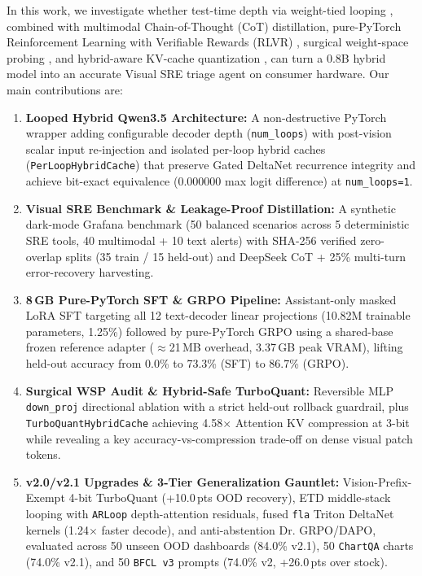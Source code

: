 \documentclass[10pt,letterpaper]{article}
\begin{document}
In this work, we investigate whether test-time depth via weight-tied looping \cite{looped}, combined with multimodal Chain-of-Thought (CoT) distillation, pure-PyTorch Reinforcement Learning with Verifiable Rewards (RLVR) \cite{deepseekr1}, surgical weight-space probing \cite{wsp}, and hybrid-aware KV-cache quantization \cite{turboquant}, can turn a 0.8B hybrid model into an accurate Visual SRE triage agent on consumer hardware. Our main contributions are:
\begin{enumerate}[leftmargin=1.5em,itemsep=2pt,topsep=3pt]
    \item \textbf{Looped Hybrid Qwen3.5 Architecture:} A non-destructive PyTorch wrapper adding configurable decoder depth (\texttt{num\_loops}) with post-vision scalar input re-injection and isolated per-loop hybrid caches (\texttt{PerLoopHybridCache}) that preserve Gated DeltaNet recurrence integrity and achieve bit-exact equivalence ($0.000000$ max logit difference) at \texttt{num\_loops=1}.
    \item \textbf{Visual SRE Benchmark \& Leakage-Proof Distillation:} A synthetic dark-mode Grafana benchmark (50 balanced scenarios across 5 deterministic SRE tools, 40 multimodal + 10 text alerts) with SHA-256 verified zero-overlap splits (35 train / 15 held-out) and DeepSeek CoT + 25\% multi-turn error-recovery harvesting.
    \item \textbf{8\,GB Pure-PyTorch SFT \& GRPO Pipeline:} Assistant-only masked LoRA SFT targeting all 12 text-decoder linear projections (10.82M trainable parameters, 1.25\%) followed by pure-PyTorch GRPO using a shared-base frozen reference adapter ($\approx$21\,MB overhead, 3.37\,GB peak VRAM), lifting held-out accuracy from 0.0\% to 73.3\% (SFT) to 86.7\% (GRPO).
    \item \textbf{Surgical WSP Audit \& Hybrid-Safe TurboQuant:} Reversible MLP \texttt{down\_proj} directional ablation with a strict held-out rollback guardrail, plus \texttt{TurboQuantHybridCache} achieving 4.58$\times$ Attention KV compression at 3-bit while revealing a key accuracy-vs-compression trade-off on dense visual patch tokens.
    \item \textbf{v2.0/v2.1 Upgrades \& 3-Tier Generalization Gauntlet:} Vision-Prefix-Exempt 4-bit TurboQuant (+10.0\,pts OOD recovery), ETD middle-stack looping with \texttt{ARLoop} depth-attention residuals, fused \texttt{fla} Triton DeltaNet kernels (1.24$\times$ faster decode), and anti-abstention Dr. GRPO/DAPO, evaluated across 50 unseen OOD dashboards (84.0\% v2.1), 50 \texttt{ChartQA} charts (74.0\% v2.1), and 50 \texttt{BFCL v3} prompts (74.0\% v2, +26.0\,pts over stock).
\end{enumerate}
\end{document}
